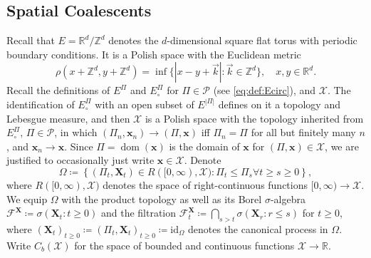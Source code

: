 \documentclass[reqno,draft]{amsart}
\numberwithin{equation}{section}
\theoremstyle{plain}
\theoremstyle{remark}
\newcommand{\R}{\mathbb{R}} %
\newcommand{\Z}{\mathbb{Z}} %
\newcommand{\id}{\mathrm{id}}
\DeclareMathOperator{\dom}{dom}
\newcommand{\fpart}{\Pi} %
\begin{document}
\subsection{Spatial Coalescents}\label{sec:spatialcoal}

Recall that $E = \R^d / \Z^d$ denotes the $d$-dimensional square flat torus with periodic boundary conditions. It is a Polish space with the Euclidean metric
\begin{equation}\label{eqdef:rho}
    \rho(x + \Z^d,y+\Z^d) = \inf \{ |x - y + \vec{k}|\colon \vec{k}\in \Z^d\},\quad x,y\in \R^d. %
\end{equation}
Recall the definitions of $E^\fpart$ and $E^\fpart_\circ $ for $\fpart\in\mathcal{P}$ (see \cref{eq:def:Ecirc}), and $\mathcal{X}$. The identification of $E^\fpart_\circ $ with an open subset of $E^{|\fpart|}$ defines on it a topology and Lebesgue measure, and then $\mathcal{X}$ is a Polish space with the topology inherited from $E^\fpart_\circ ,\, \fpart\in \mathcal{P}$, in which $(\fpart_n,\boldsymbol x_n) \to (\fpart,\boldsymbol x)$ iff $\fpart_n = \fpart$ for all but finitely many $n$, and $\boldsymbol x_n \to \boldsymbol x$. %
Since $\fpart = \dom(\boldsymbol x)$ is the domain of $\boldsymbol x$ for $(\fpart,\boldsymbol x) \in \mathcal{X}$, we are justified to occasionally just write $\boldsymbol x\in \mathcal{X}$. Denote
\begin{equation*}%
    \Omega \coloneqq \left\{ (\fpart_t,\boldsymbol X_t) \in R([0,\infty), \mathcal{X})\colon \fpart_t \le \fpart_s \forall t \ge s \ge 0 \right\},
\end{equation*}
where $R([0,\infty),\mathcal{X})$ denotes the space of right-continuous functions $[0,\infty) \to \mathcal{X}$.
We equip $\Omega$ with the product topology as well as its Borel $\sigma$-algebra $\mathcal{F}^{\boldsymbol X} \coloneqq \sigma(\boldsymbol X_t\colon t\ge 0)$ and the filtration $\mathcal{F}^{\boldsymbol X}_t \coloneqq \bigcap_{s > t} \sigma(\boldsymbol X_r\colon r \le s)$ for $t \ge 0$, where $(\boldsymbol X_t)_{t\ge 0}\coloneqq (\fpart_t,\boldsymbol X_t)_{t\ge 0} \coloneqq \id_{\Omega}$ denotes the canonical process in $\Omega$. Write $C_b(\mathcal{X})$ for the space of bounded and continuous functions $\mathcal{X}\to \R$.
\end{document}
